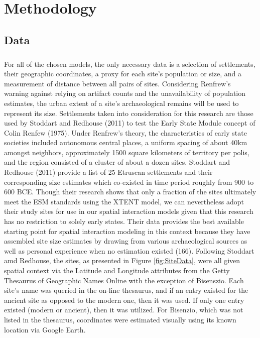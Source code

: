 \documentclass[12pt,a4paper]{thesis}
\begin{document}
\chapter{Methodology}
\section{Data}

\paragraph{}
For all of the chosen models, the only necessary data is a selection of settlements, their geographic coordinates, a proxy for each site's population or size, and a measurement of distance between all pairs of sites. Considering Renfrew's warning against relying on artifact counts and the unavailability of population estimates, the urban extent of a site's archaeological remains will be used to represent its size. Settlements taken into consideration for this research are those used by Stoddart and Redhouse (2011) to test the Early State Module concept of Colin Renfew (1975). Under Renfrew's theory, the characteristics of early state societies included autonomous central places,  a uniform spacing of about 40km amongst neighbors, approximately 1500 square kilometers of territory per polis, and the region consisted of a cluster of about a dozen sites. Stoddart and Redhouse (2011) provide a list of 25 Etruscan settlements and their corresponding size estimates which co-existed in time period roughly from 900 to 600 BCE. Though their research shows that only a fraction of the sites ultimately meet the ESM standards using the XTENT model, we can nevertheless adopt their study sites for use in our spatial interaction models given that this research has no restriction to solely early states. Their data provides the best available starting point for spatial interaction modeling in this context because they have assembled site size estimates by drawing from various archaeological sources as well as personal experience when no estimation existed (166). Following Stoddart amd Redhouse, the sites, as presented in Figure \ref{fig:SiteData}, were all given spatial context via the Latitude and Longitude attributes from the Getty Thesaurus of Geographic Names Online with the exception of Bisenszio. Each site's name was queried in the on-line thesaurus, and if an entry existed for the ancient site as opposed to the modern one, then it was used. If only one entry existed (modern or ancient), then it was utilized. For Bisenzio, which was not listed in the thesaurus, coordinates were estimated visually using its known location via Google Earth.
\end{document}

